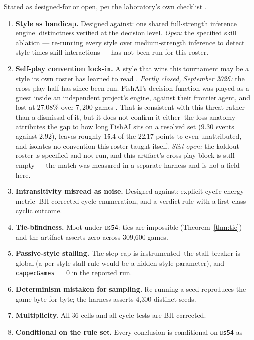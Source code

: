 \documentclass[11pt]{article}
\newcommand{\code}[1]{\texttt{#1}}
\newcommand{\usff}{\code{us54}}
\begin{document}
Stated as designed-for or open, per the laboratory's own checklist \cite{botlab}.

\begin{enumerate}
\item \textbf{Style as handicap.} Designed against: one shared full-strength inference engine;
  distinctness verified at the decision level. \emph{Open:} the specified skill ablation ---
  re-running every style over medium-strength inference to detect style-times-skill
  interactions --- has not been run for this roster.
\item \textbf{Self-play convention lock-in.} A style that wins this tournament may be a style
  its own roster has learned to read \cite{hu2020}. \emph{Partly closed, September 2026:} the
  cross-play half has since been run. FishAI's decision function was played as a guest inside an
  independent project's engine, against their frontier agent, and lost at $27.08\%$ over
  $7{,}200$ games \cite{frontierpaper}. That is consistent with this threat rather than a
  dismissal of it, but it does not confirm it either: the loss anatomy attributes the gap to how
  long FishAI sits on a resolved set ($9.30$ events against $2.92$), leaves roughly $16.4$ of
  the $22.17$ points to even unattributed, and isolates no convention this roster taught itself.
  \emph{Still open:} the holdout roster is specified and not run, and this artifact's cross-play
  block is still empty --- the match was measured in a separate harness and is not a field here.
\item \textbf{Intransitivity misread as noise.} Designed against: explicit cyclic-energy
  metric, BH-corrected cycle enumeration, and a verdict rule with a first-class cyclic
  outcome.
\item \textbf{Tie-blindness.} Moot under \usff{}: ties are impossible
  (Theorem~\ref{thm:tie}) and the artifact asserts zero across 309{,}600 games.
\item \textbf{Passive-style stalling.} The step cap is instrumented, the stall-breaker is
  global (a per-style stall rule would be a hidden style parameter), and
  \code{cappedGames} $= 0$ in the reported run.
\item \textbf{Determinism mistaken for sampling.} Re-running a seed reproduces the game
  byte-for-byte; the harness asserts 4{,}300 distinct seeds.
\item \textbf{Multiplicity.} All 36 cells and all cycle tests are BH-corrected.
\item \textbf{Conditional on the rule set.} Every conclusion is conditional on \usff{} as

\end{enumerate}
\end{document}
